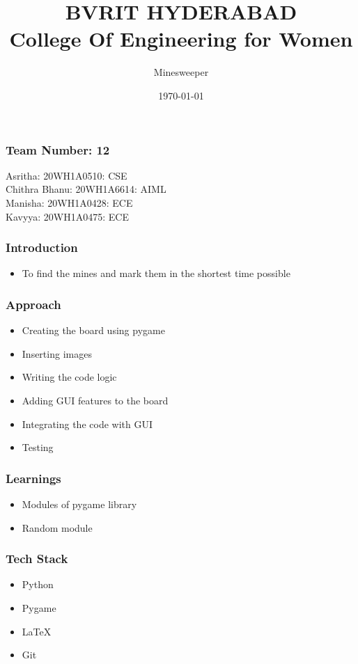 \documentclass[14pt]{beamer}
\title{BVRIT HYDERABAD\\ College Of Engineering for Women}
\author{Minesweeper}
\date{\today}
\begin{document}
    \begin{frame}
        \titlepage
    \end{frame}
	\begin{frame}
		\frametitle{Team Number: 12}
			\centering
			Asritha: 20WH1A0510: CSE\\
			Chithra Bhanu: 20WH1A6614: AIML\\
			Manisha: 20WH1A0428: ECE\\
			Kavyya: 20WH1A0475: ECE\\
	\end{frame}
    \begin{frame}
	\frametitle{Introduction}
        \begin{itemize}
	    \item To find the mines and mark them in the shortest time possible
	\end{itemize}
    \end{frame}
    \begin{frame}
	\frametitle{Approach}
	\begin{itemize}
	    \item Creating the board using pygame\\
        \item Inserting images\\
        \item Writing the code logic 
	    \item Adding GUI features to the board \\
	    \item Integrating the code with GUI
	    \item Testing

	\end{itemize}
    \end{frame}
    \begin{frame}
        \frametitle{Learnings}
	\begin{itemize}
	    \item Modules of pygame library
	    \item Random module 
	\end{itemize}
    \end{frame}
    \begin{frame}
        \frametitle{Tech Stack}
	\begin{itemize}
	    \item Python 
	    \item Pygame
	    \item LaTeX
	    \item Git
	\end{itemize}
    \end{frame}
\end{document}
